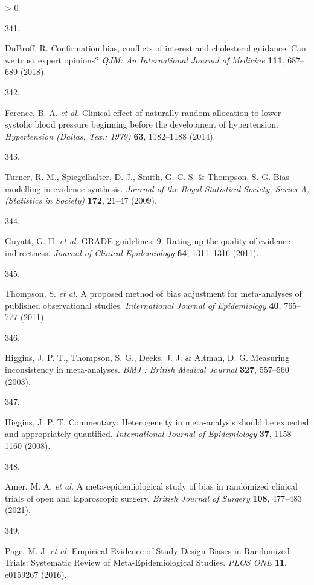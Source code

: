\documentclass[a4paper, twoside]{templates/ociamthesis}
\newlength{\cslhangindent}
\newlength{\csllabelwidth}
\newenvironment{CSLReferences}[3] %
 {%
  \setlength{\parindent}{0pt}
  \ifodd #1 \everypar{\setlength{\hangindent}{\cslhangindent}}\ignorespaces\fi
  \ifnum #2 > 0
  \setlength{\parskip}{#2\baselineskip}
  \fi
 }%
 {}
\newcommand{\CSLLeftMargin}[1]{\parbox[t]{\maxof{\widthof{#1}}{\csllabelwidth}}{#1}}
\newcommand{\CSLRightInline}[1]{\parbox[t]{\linewidth - \csllabelwidth}{#1}}
\begin{document}
\begin{CSLReferences}{0}{0}
\leavevmode\hypertarget{ref-dubroff2018}{}%
\CSLLeftMargin{341. }
\CSLRightInline{DuBroff, R. Confirmation bias, conflicts of interest and cholesterol guidance: Can we trust expert opinions? \emph{QJM: An International Journal of Medicine} \textbf{111}, 687--689 (2018).}

\leavevmode\hypertarget{ref-ference2014}{}%
\CSLLeftMargin{342. }
\CSLRightInline{Ference, B. A. \emph{et al.} Clinical effect of naturally random allocation to lower systolic blood pressure beginning before the development of hypertension. \emph{Hypertension (Dallas, Tex.: 1979)} \textbf{63}, 1182--1188 (2014).}

\leavevmode\hypertarget{ref-turner2009}{}%
\CSLLeftMargin{343. }
\CSLRightInline{Turner, R. M., Spiegelhalter, D. J., Smith, G. C. S. \& Thompson, S. G. Bias modelling in evidence synthesis. \emph{Journal of the Royal Statistical Society. Series A, (Statistics in Society)} \textbf{172}, 21--47 (2009).}

\leavevmode\hypertarget{ref-guyatt2011}{}%
\CSLLeftMargin{344. }
\CSLRightInline{Guyatt, G. H. \emph{et al.} {GRADE} guidelines: 9. {Rating} up the quality of evidence - indirectness. \emph{Journal of Clinical Epidemiology} \textbf{64}, 1311--1316 (2011).}

\leavevmode\hypertarget{ref-thompson2011}{}%
\CSLLeftMargin{345. }
\CSLRightInline{Thompson, S. \emph{et al.} A proposed method of bias adjustment for meta-analyses of published observational studies. \emph{International Journal of Epidemiology} \textbf{40}, 765--777 (2011).}

\leavevmode\hypertarget{ref-higgins2003}{}%
\CSLLeftMargin{346. }
\CSLRightInline{Higgins, J. P. T., Thompson, S. G., Deeks, J. J. \& Altman, D. G. Measuring inconsistency in meta-analyses. \emph{BMJ : British Medical Journal} \textbf{327}, 557--560 (2003).}

\leavevmode\hypertarget{ref-higgins2008}{}%
\CSLLeftMargin{347. }
\CSLRightInline{Higgins, J. P. T. Commentary: Heterogeneity in meta-analysis should be expected and appropriately quantified. \emph{International Journal of Epidemiology} \textbf{37}, 1158--1160 (2008).}

\leavevmode\hypertarget{ref-amer2021}{}%
\CSLLeftMargin{348. }
\CSLRightInline{Amer, M. A. \emph{et al.} A meta-epidemiological study of bias in randomized clinical trials of open and laparoscopic surgery. \emph{British Journal of Surgery} \textbf{108}, 477--483 (2021).}

\leavevmode\hypertarget{ref-page2016}{}%
\CSLLeftMargin{349. }
\CSLRightInline{Page, M. J. \emph{et al.} Empirical {Evidence} of {Study Design Biases} in {Randomized Trials}: Systematic {Review} of {Meta}-{Epidemiological Studies}. \emph{PLOS ONE} \textbf{11}, e0159267 (2016).}


\end{CSLReferences}
\end{document}
